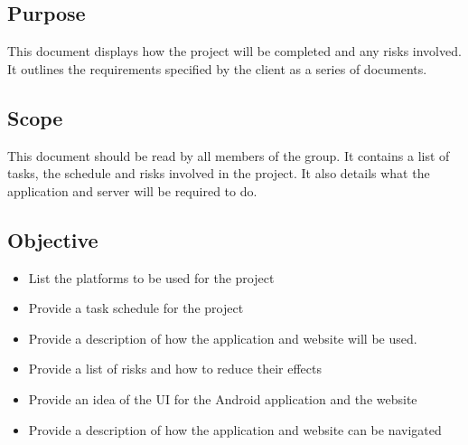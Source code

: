 \documentclass[12pt, portrait]{article}
\begin{document}
\subsection{Purpose}
This document displays how the project will be completed and any risks involved.  It outlines the requirements specified by the client as a series of documents.
\subsection{Scope}
This document should be read by all members of the group. It contains a list of tasks, the schedule and risks involved in the project. It also details what the application and server will be required to do.
\subsection{Objective}
\begin{itemize}
\item List the platforms to be used for the project
\item Provide a task schedule for the project 
\item Provide a description of how the application and website will be used.
\item Provide a list of risks and how to reduce their effects
\item Provide an idea of the UI for the Android application and the website
\item Provide a description of how the application and website can be navigated
\end{itemize}
\newpage
\end{document}
